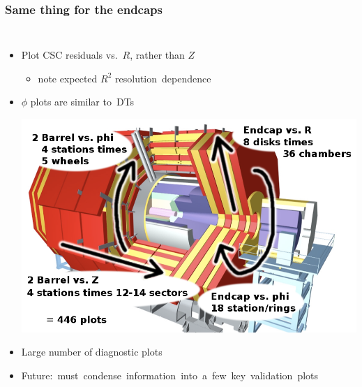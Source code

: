 \documentclass[compress]{beamer}
\begin{document}
\begin{frame}
\frametitle{Same thing for the endcaps}

\begin{minipage}{\linewidth}
\begin{columns}

\begin{itemize}\setlength{\itemsep}{0.2 cm}
\item Plot CSC residuals vs.\ $R$, rather than $Z$
\begin{itemize}
\item note expected $R^2$ \mbox{resolution dependence\hspace{-1 cm}}
\end{itemize}

\item $\phi$ plots are similar \mbox{to DTs\hspace{-1 cm}}

\vspace{0.2 cm}
\mbox{\hspace{-0.5 cm}\includegraphics[width=1.3\linewidth]{CMS_cutaway.png}}

\vspace{0.2 cm}
\item Large number of diagnostic plots
\item \mbox{Future: must condense information into a few key validation plots\hspace{-10 cm}}
\end{itemize}



\end{columns}
\end{minipage}
\end{frame}
\end{document}

